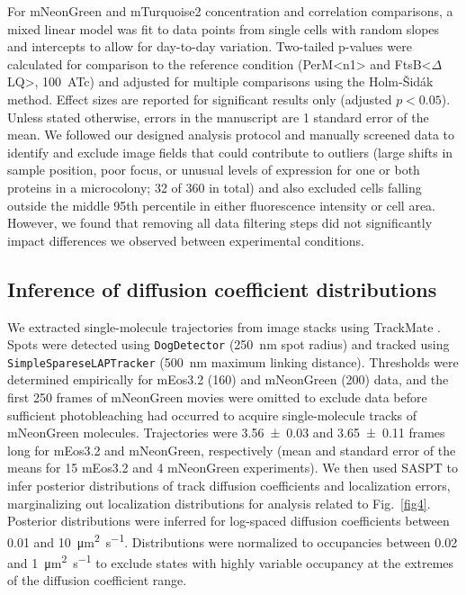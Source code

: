 \documentclass[twocolumn,pdflatex,sn-nature]{sn-jnl}%
\def\textsuperscript#1{<#1>}%
\newcommand\ftsbdLQ{FtsB\textsuperscript{$\Delta{}$LQ}}
\newcommand\permN{PerM\textsuperscript{n1}}
\begin{document}
For mNeonGreen and mTurquoise2 concentration and correlation comparisons, a mixed linear model was fit to data points from single cells with random slopes and intercepts to allow for day-to-day variation.
Two-tailed p-values were calculated for comparison to the reference condition (\permN{} and \ftsbdLQ{}, \qty{100}{\nM}~ATc) and adjusted for multiple comparisons using the Holm-Šidák method.
Effect sizes are reported for significant results only (adjusted $p<0.05$).
Unless stated otherwise, errors in the manuscript are 1 standard error of the mean.
We followed our designed analysis protocol and manually screened data to identify and exclude image fields that could contribute to outliers (large shifts in sample position, poor focus, or unusual levels of expression for one or both proteins in a microcolony; 32 of 360 in total) and also excluded cells falling outside the middle 95th percentile in either fluorescence intensity or cell area.
However, we found that removing all data filtering steps did not significantly impact differences we observed between experimental conditions.

\subsection{Inference of diffusion coefficient distributions}

We extracted single-molecule trajectories from image stacks using TrackMate \citep{tinevezTrackMateOpenExtensible2017}. Spots were detected using \verb|DogDetector| (\qty{250}{\nm} spot radius) and tracked using \verb|SimpleSpareseLAPTracker| (\qty{500}{\nm} maximum linking distance).
Thresholds were determined empirically for mEos3.2 (160) and mNeonGreen (200) data, and the first 250 frames of mNeonGreen movies were omitted to exclude data before sufficient photobleaching had occurred to acquire single-molecule tracks of mNeonGreen molecules.
Trajectories were \num{3.56 +- 0.03} and \num{3.65 +- 0.11} frames long for mEos3.2 and mNeonGreen, respectively (mean and standard error of the means for 15 mEos3.2 and 4 mNeonGreen experiments).
We then used SASPT \citep{heckertRecoveringMixturesFastdiffusing2022a} to infer posterior distributions of track diffusion coefficients and localization errors, marginalizing out localization distributions for analysis related to Fig.~\ref{fig4}.
Posterior distributions were inferred for log-spaced diffusion coefficients between \num{0.01} and \qty{10}{\square\um\per\s}.
Distributions were normalized to occupancies between \num{0.02} and \qty{1}{\square\um\per\s} to exclude states with highly variable occupancy at the extremes of the diffusion coefficient range.
\end{document}
